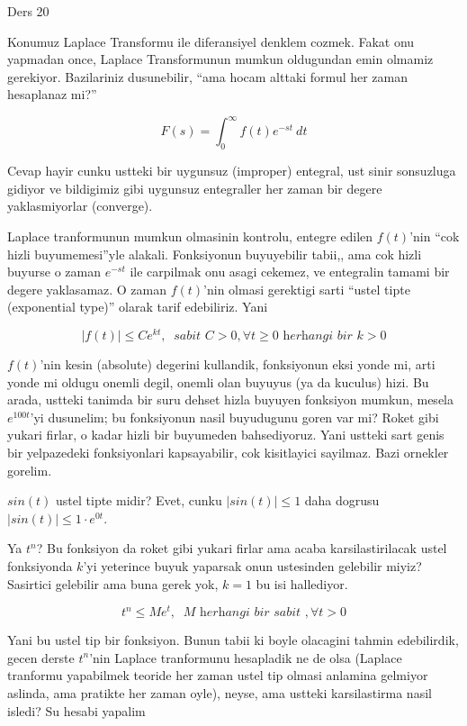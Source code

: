\documentclass[12pt,fleqn]{article}
\begin{document}
Ders 20

Konumuz Laplace Transformu ile diferansiyel denklem cozmek. Fakat onu
yapmadan once, Laplace Transformunun mumkun oldugundan emin olmamiz
gerekiyor. Bazilariniz dusunebilir, ``ama hocam alttaki formul her zaman
hesaplanaz mi?''

\[ F(s) = \int_0^{\infty} f(t)e^{-st} \ dt \]

Cevap hayir cunku ustteki bir uygunsuz (improper) entegral, ust sinir
sonsuzluga gidiyor ve bildigimiz gibi uygunsuz entegraller her zaman bir
degere yaklasmiyorlar (converge). 

Laplace tranformunun mumkun olmasinin kontrolu, entegre edilen $f(t)$'nin
``cok hizli buyumemesi''yle alakali. Fonksiyonun buyuyebilir tabii,, ama
cok hizli buyurse o zaman $e^{-st}$ ile carpilmak onu asagi cekemez, ve
entegralin tamami bir degere yaklasamaz. O zaman $f(t)$'nin olmasi
gerektigi sarti ``ustel tipte (exponential type)'' olarak tarif
edebiliriz. Yani 

\[ |f(t)| \le C e^{kt}, \ \textit{ sabit } C > 0, \forall t \ge 0 
\textit{ herhangi bir } k > 0
\]

$f(t)$'nin kesin (absolute) degerini kullandik, fonksiyonun eksi yonde mi,
arti yonde mi oldugu onemli degil, onemli olan buyuyus (ya da kuculus)
hizi. Bu arada, ustteki tanimda bir suru dehset hizla buyuyen fonksiyon
mumkun, mesela $e^{100t}$'yi dusunelim; bu fonksiyonun nasil buyudugunu
goren var mi? Roket gibi yukari firlar, o kadar hizli bir buyumeden
bahsediyoruz. Yani ustteki sart genis bir yelpazedeki fonksiyonlari
kapsayabilir, cok kisitlayici sayilmaz. Bazi ornekler gorelim.

$sin(t)$ ustel tipte midir? Evet, cunku $|sin(t)| \le 1$ daha dogrusu
$|sin(t)| \le 1 \cdot e^{0t}$. 

Ya $t^n$? Bu fonksiyon da roket gibi yukari firlar ama acaba
karsilastirilacak ustel fonksiyonda $k$'yi yeterince buyuk yaparsak onun
ustesinden gelebilir miyiz? Sasirtici gelebilir ama buna gerek yok, $k=1$
bu isi hallediyor. 

\[ t^n \le M e^t, \ \textit{ M herhangi bir sabit }, \forall t > 0 \]

Yani bu ustel tip bir fonksiyon. Bunun tabii ki boyle olacagini tahmin
edebilirdik, gecen derste $t^n$'nin Laplace tranformunu hesapladik ne de
olsa (Laplace tranformu yapabilmek teoride her zaman ustel tip olmasi
anlamina gelmiyor aslinda, ama pratikte her zaman oyle), neyse, ama ustteki
karsilastirma nasil isledi? Su hesabi yapalim
\end{document}
